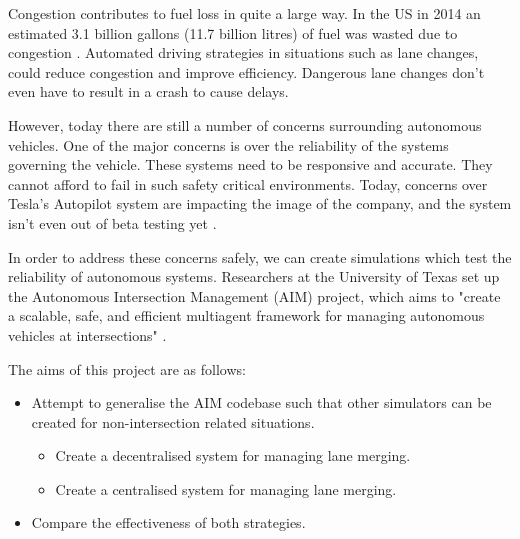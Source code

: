 Congestion contributes to fuel loss in quite a large way. In the US in 2014 an estimated 3.1 billion gallons (11.7 billion litres) of fuel was wasted due to congestion \citep{Schrank2015}. Automated driving strategies in situations such as lane changes, could reduce congestion and improve efficiency. Dangerous lane changes don't even have to result in a crash to cause delays.


However, today there are still a number of concerns surrounding autonomous vehicles. One of the major concerns is over the reliability of the systems governing the vehicle. These systems need to be responsive and accurate. They cannot afford to fail in such safety critical environments. Today, concerns over Tesla's Autopilot system are impacting the image of the company, and the system isn't even out of beta testing yet \citep{TeslaCriticised}. 

In order to address these concerns safely, we can create simulations which test the reliability of autonomous systems. Researchers at the University of Texas set up the Autonomous Intersection Management (AIM) project, which aims to "create a scalable, safe, and efficient multiagent framework for managing autonomous vehicles at intersections" \citep{AIMProject}.


The aims of this project are as follows:
\begin{itemize}
\item Attempt to generalise the AIM codebase such that other simulators can be created for non-intersection related situations.
\begin{itemize}
\item Create a decentralised system for managing lane merging.
\item Create a centralised system for managing lane merging.
\end{itemize}
\item Compare the effectiveness of both strategies.
\end{itemize}
